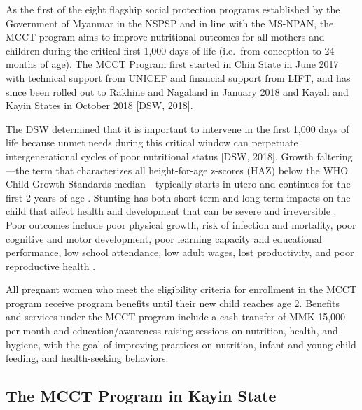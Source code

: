 \documentclass[12pt,a4paper]{article}
\begin{document}
As the first of the eight flagship social protection programs established by the Government of Myanmar in the NSPSP and in line with the MS-NPAN, the MCCT program aims to improve nutritional outcomes for all mothers and children during the critical first 1,000 days of life (i.e.~from conception to 24 months of age). The MCCT Program first started in Chin State in June 2017 with technical support from UNICEF and financial support from LIFT, and has since been rolled out to Rakhine and Nagaland in January 2018 and Kayah and Kayin States in October 2018 {[}DSW, 2018{]}.

The DSW determined that it is important to intervene in the first 1,000 days of life because unmet needs during this critical window can perpetuate intergenerational cycles of poor nutritional status {[}DSW, 2018{]}. Growth faltering---the term that characterizes all height-for-age z-scores (HAZ) below the WHO Child Growth Standards median---typically starts in utero and continues for the first 2 years of age \citep{DeOnis2016, Shrimpton2001, Victora2008}. Stunting has both short-term and long-term impacts on the child that affect health and development that can be severe and irreversible \citep{DeOnis2016}. Poor outcomes include poor physical growth, risk of infection and mortality, poor cognitive and motor development, poor learning capacity and educational performance, low school attendance, low adult wages, lost productivity, and poor reproductive health \citep{DeOnis2016}.

All pregnant women who meet the eligibility criteria for enrollment in the MCCT program receive program benefits until their new child reaches age 2. Benefits and services under the MCCT program include a cash transfer of MMK 15,000 per month and education/awareness-raising sessions on nutrition, health, and hygiene, with the goal of improving practices on nutrition, infant and young child feeding, and health-seeking behaviors.

\hypertarget{the-mcct-program-in-kayin-state}{%
\subsection{The MCCT Program in Kayin State}\label{the-mcct-program-in-kayin-state}}
\end{document}

